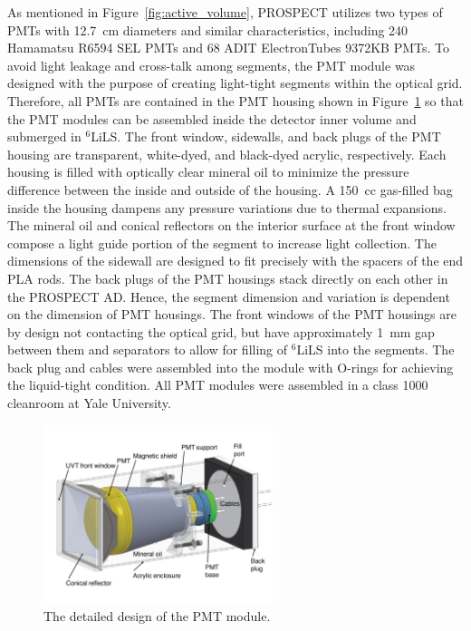 
As mentioned in Figure~\ref{fig:active_volume}, PROSPECT utilizes two types of PMTs with 12.7~cm diameters and similar characteristics, including 240 Hamamatsu R6594 SEL PMTs and 68 ADIT ElectronTubes 9372KB PMTs.
To avoid light leakage and cross-talk among segments, the PMT module was designed with the purpose of creating light-tight segments within the optical grid.
Therefore, all PMTs are contained in the PMT housing shown in Figure~\ref{fig:pmtmodule} so that the PMT modules can be assembled inside the detector inner volume and submerged in $^6$LiLS.
The front window, sidewalls, and back plugs of the PMT housing are transparent, white-dyed, and black-dyed acrylic, respectively.
Each housing is filled with optically clear mineral oil to minimize the pressure difference between the inside and outside of the housing.
A 150~cc gas-filled bag inside the housing dampens any pressure variations due to thermal expansions.
The mineral oil and conical reflectors on the interior surface at the front window compose a light guide portion of the segment to increase light collection.
The dimensions of the sidewall are designed to fit precisely with the spacers of the end PLA rods. 
The back plugs of the PMT housings stack directly on each other in the PROSPECT AD. 
Hence, the segment dimension and variation is dependent on the dimension of PMT housings.
The front windows of the PMT housings are by design not contacting the optical grid, but have approximately 1~mm gap between them and separators to allow for filling of $^6$LiLS into the segments.
The back plug and cables were assembled into the module with O-rings for achieving the liquid-tight condition. 
All PMT modules were assembled in a class 1000 cleanroom at Yale University.

\begin{figure}[h!]
\centering
\includegraphics[width=0.6\textwidth]{Figures/PMTModule.pdf}
\caption[Design of the PMT modules]{The detailed design of the PMT module.}
\label{fig:pmtmodule}
\end{figure}

